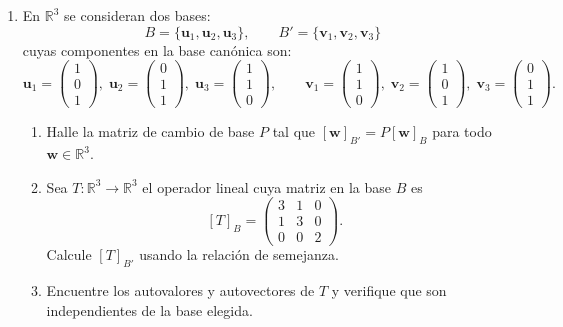 \documentclass[12pt]{article}
\begin{document}
\begin{enumerate}
\item[\textbf{Problema 2}] En \(\mathbb{R}^3\) se consideran dos bases:
\[
B = \{ \mathbf{u}_1, \mathbf{u}_2, \mathbf{u}_3 \}, \qquad
B' = \{ \mathbf{v}_1, \mathbf{v}_2, \mathbf{v}_3 \}
\]
cuyas componentes en la base canónica son:
\[
\mathbf{u}_1 = \begin{pmatrix}1\\0\\1\end{pmatrix},\;
\mathbf{u}_2 = \begin{pmatrix}0\\1\\1\end{pmatrix},\;
\mathbf{u}_3 = \begin{pmatrix}1\\1\\0\end{pmatrix},\qquad
\mathbf{v}_1 = \begin{pmatrix}1\\1\\0\end{pmatrix},\;
\mathbf{v}_2 = \begin{pmatrix}1\\0\\1\end{pmatrix},\;
\mathbf{v}_3 = \begin{pmatrix}0\\1\\1\end{pmatrix}.
\]

\begin{enumerate}
    \item[a)] Halle la matriz de cambio de base \(P\) tal que \([\mathbf{w}]_{B'} = P [\mathbf{w}]_{B}\) para todo \(\mathbf{w} \in \mathbb{R}^3\).
    
    \item[b)] Sea \(T: \mathbb{R}^3 \to \mathbb{R}^3\) el operador lineal cuya matriz en la base \(B\) es
    \[
    [T]_B = \begin{pmatrix} 3 & 1 & 0 \\ 1 & 3 & 0 \\ 0 & 0 & 2 \end{pmatrix}.
    \]
    Calcule \([T]_{B'}\) usando la relación de semejanza.
    
    \item[c)] Encuentre los autovalores y autovectores de \(T\) y verifique que son independientes de la base elegida.
\end{enumerate}


\end{enumerate}
\end{document}
